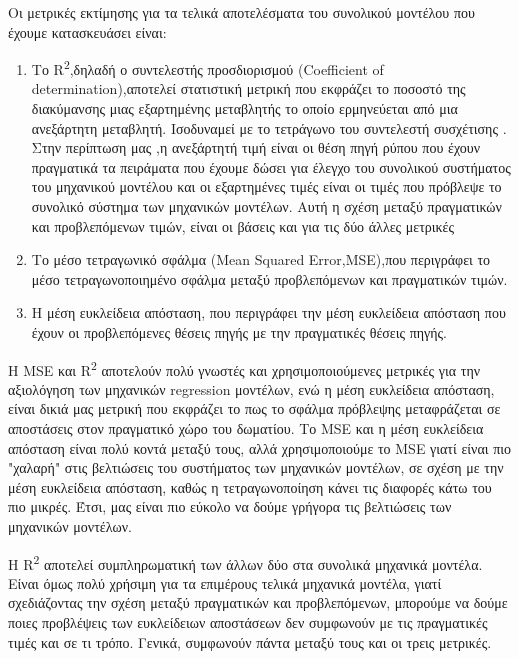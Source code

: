 Οι μετρικές εκτίμησης για  τα τελικά αποτελέσματα του συνολικού μοντέλου που έχουμε κατασκευάσει είναι:

\begin{enumerate}
    \item Το R\textsuperscript{2},δηλαδή ο συντελεστής προσδιορισμού (Coefficient of determination),αποτελεί στατιστική μετρική που εκφράζει το ποσοστό της διακύμανσης μιας εξαρτημένης μεταβλητής το οποίο ερμηνεύεται από μια ανεξάρτητη μεταβλητή. Ισοδυναμεί με το τετράγωνο του συντελεστή συσχέτισης \cite{r2}.
    Στην περίπτωση μας ,η ανεξάρτητή τιμή είναι οι θέση πηγή ρύπου που έχουν πραγματικά τα πειράματα που έχουμε δώσει για έλεγχο του συνολικού συστήματος του μηχανικού μοντέλου και οι εξαρτημένες τιμές είναι οι τιμές που πρόβλεψε το συνολικό σύστημα των μηχανικών μοντέλων.
    Αυτή η σχέση μεταξύ πραγματικών και προβλεπόμενων τιμών, είναι οι βάσεις και για τις δύο άλλες μετρικές
    \item Το μέσο τετραγωνικό σφάλμα (Mean Squared Error,MSE),που περιγράφει το μέσο τετραγωνοποιημένο σφάλμα μεταξύ προβλεπόμενων και πραγματικών τιμών.
    \item Η μέση ευκλείδεια απόσταση, που περιγράφει την μέση ευκλείδεια απόσταση που έχουν οι προβλεπόμενες θέσεις πηγής με την πραγματικές θέσεις πηγής.
\end{enumerate}

Η MSE και R\textsuperscript{2} αποτελούν πολύ γνωστές και χρησιμοποιούμενες μετρικές για την αξιολόγηση των μηχανικών regression μοντέλων, ενώ η μέση ευκλείδεια απόσταση,
είναι δικιά μας μετρική που εκφράζει το πως το σφάλμα πρόβλεψης μεταφράζεται σε αποστάσεις στον πραγματικό χώρο του δωματίου.
Το MSE και η μέση ευκλείδεια απόσταση είναι πολύ κοντά μεταξύ τους, αλλά χρησιμοποιούμε το MSE γιατί είναι πιο "χαλαρή" στις βελτιώσεις του συστήματος των μηχανικών μοντέλων,
σε σχέση με την  μέση ευκλείδεια απόσταση, καθώς η τετραγωνοποίηση κάνει τις διαφορές κάτω του πιο μικρές.
Έτσι, μας είναι πιο εύκολο να δούμε γρήγορα τις βελτιώσεις των μηχανικών μοντέλων.

Η R\textsuperscript{2} αποτελεί συμπληρωματική των άλλων δύο στα συνολικά μηχανικά μοντέλα. Είναι όμως πολύ χρήσιμη για τα επιμέρους τελικά μηχανικά μοντέλα,
γιατί σχεδιάζοντας την σχέση μεταξύ πραγματικών και προβλεπόμενων,
μπορούμε να δούμε ποιες προβλέψεις των ευκλείδειων αποστάσεων δεν συμφωνούν με τις πραγματικές τιμές και σε τι τρόπο.
Γενικά, συμφωνούν πάντα μεταξύ τους και οι τρεις μετρικές.
